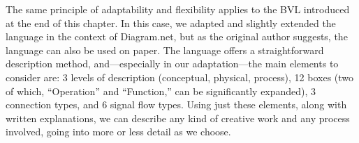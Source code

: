 The same principle of adaptability and flexibility applies to the BVL introduced at the end of this chapter. In this case, we adapted and slightly extended the language in the context of Diagram.net, but as the original author suggests, the language can also be used on paper. The language offers a straightforward description method, and—especially in our adaptation—the main elements to consider are: 3 levels of description (conceptual, physical, process), 12 boxes (two of which, “Operation” and “Function,” can be significantly expanded), 3 connection types, and 6 signal flow types. Using just these elements, along with written explanations, we can describe any kind of creative work and any process involved, going into more or less detail as we choose.
